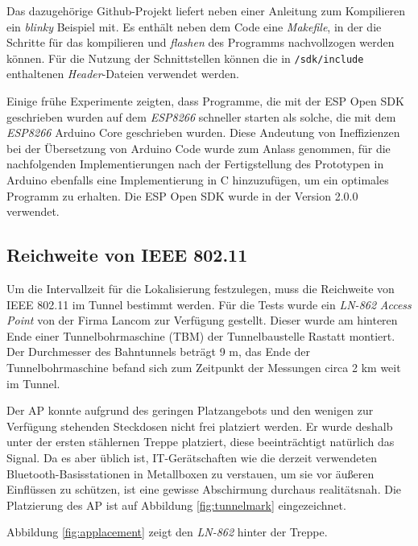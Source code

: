 Das dazugehörige Github-Projekt liefert neben einer Anleitung zum Kompilieren ein \textit{blinky} Beispiel mit.
Es enthält neben dem Code eine \emph{Makefile}, in der die Schritte für das kompilieren und \emph{flashen} des Programms nachvollzogen werden können.
Für die Nutzung der Schnittstellen können die in \texttt{/sdk/include} enthaltenen \emph{Header}-Dateien verwendet werden. 

Einige frühe Experimente zeigten, dass Programme, die mit der ESP Open SDK geschrieben wurden auf dem \emph{ESP8266} schneller starten als solche, die mit dem \emph{ESP8266} Arduino Core geschrieben wurden.
Diese Andeutung von Ineffizienzen bei der Übersetzung von Arduino Code wurde zum Anlass genommen, für die nachfolgenden Implementierungen nach der Fertigstellung des Prototypen in Arduino ebenfalls eine Implementierung in C hinzuzufügen, um ein optimales Programm zu erhalten. 
Die ESP Open SDK wurde in der Version 2.0.0 verwendet.




\subsection{Reichweite von IEEE 802.11}
\label{ch:phase1:sec:rangewlan}
Um die Intervallzeit für die Lokalisierung festzulegen, muss die Reichweite von IEEE 802.11 im Tunnel bestimmt werden.
Für die Tests wurde ein \emph{LN-862} \emph{Access Point} von der Firma Lancom zur Verfügung gestellt.
Dieser wurde am hinteren Ende einer Tunnelbohrmaschine (TBM) der Tunnelbaustelle Rastatt montiert.
Der Durchmesser des Bahntunnels beträgt 9 m, das Ende der Tunnelbohrmaschine befand sich zum Zeitpunkt der Messungen circa 2 km weit im Tunnel.

Der AP konnte aufgrund des geringen Platzangebots und den wenigen zur Verfügung stehenden Steckdosen nicht frei platziert werden.
Er wurde deshalb unter der ersten stählernen Treppe platziert, diese beeinträchtigt natürlich das Signal.
Da es aber üblich ist, IT-Gerätschaften wie die derzeit verwendeten Bluetooth-Basisstationen in Metallboxen zu verstauen, um sie vor äußeren Einflüssen zu schützen, ist eine gewisse Abschirmung durchaus realitätsnah.
Die Platzierung des AP ist auf Abbildung \ref{fig:tunnelmark} eingezeichnet.

Abbildung \ref{fig:applacement} zeigt den \emph{LN-862} hinter der Treppe.

